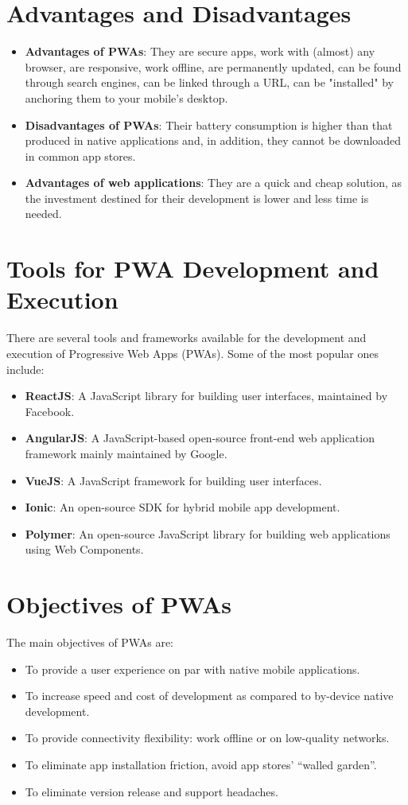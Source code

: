 \documentclass{article}
\begin{document}
\begin{multicols}{2}
	\section{Advantages and Disadvantages}
	\begin{itemize}
		\item \textbf{Advantages of PWAs}: They are secure apps, work with (almost) any browser, are responsive, work offline, are permanently updated, can be found through search engines, can be linked through a URL, can be "installed" by anchoring them to your mobile's desktop.
		\item \textbf{Disadvantages of PWAs}: Their battery consumption is higher than that produced in native applications and, in addition, they cannot be downloaded in common app stores.
		\item \textbf{Advantages of web applications}: They are a quick and cheap solution, as the investment destined for their development is lower and less time is needed.
	\end{itemize}
	\section{Tools for PWA Development and Execution}
	There are several tools and frameworks available for the development and execution of Progressive Web Apps (PWAs). Some of the most popular ones include:
	\begin{itemize}
		\item \textbf{ReactJS}: A JavaScript library for building user interfaces, maintained by Facebook.
		\item \textbf{AngularJS}: A JavaScript-based open-source front-end web application framework mainly maintained by Google.
		\item \textbf{VueJS}: A JavaScript framework for building user interfaces.
		\item \textbf{Ionic}: An open-source SDK for hybrid mobile app development.
		\item \textbf{Polymer}: An open-source JavaScript library for building web applications using Web Components.
	\end{itemize}
	
	\section{Objectives of PWAs}
	The main objectives of PWAs are:
	\begin{itemize}
		\item To provide a user experience on par with native mobile applications.
		\item To increase speed and cost of development as compared to by-device native development.
		\item To provide connectivity flexibility: work offline or on low-quality networks.
		\item To eliminate app installation friction, avoid app stores’ “walled garden”.
		\item To eliminate version release and support headaches.
	\end{itemize}
	

\end{multicols}
\end{document}
